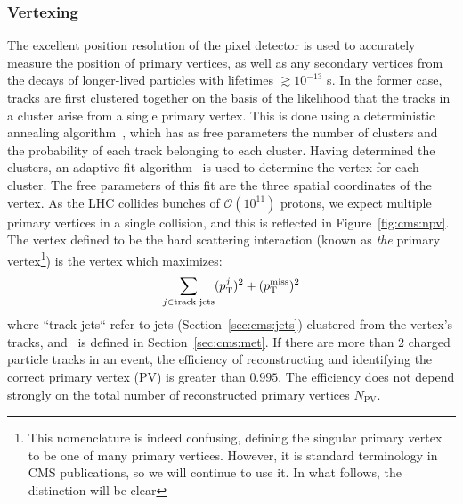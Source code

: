 \subsubsection{Vertexing}

The excellent position resolution of the pixel detector is used to accurately measure the position of primary vertices, as well as any secondary vertices from the decays of longer-lived particles with lifetimes $\gtrsim 10^{-13}$ s.
In the former case, tracks are first clustered together on the basis of the likelihood that the tracks in a cluster arise from a single primary vertex.
This is done using a deterministic annealing algorithm~\cite{da}, which has as free parameters the number of clusters and the probability of each track belonging to each cluster.
Having determined the clusters, an adaptive fit algorithm~\cite{adaptivefit} is used to determine the vertex for each cluster.
The free parameters of this fit are the three spatial coordinates of the vertex.
As the LHC collides bunches of $\mathcal{O}(10^{11})$ protons, we expect multiple primary vertices in a single collision, and this is reflected in Figure~\ref{fig:cms:npv}.
The vertex defined to be the hard scattering interaction (known as \emph{the} primary vertex\footnote{This nomenclature is indeed confusing, defining the singular primary vertex to be one of many primary vertices. However, it is standard terminology in CMS publications, so we will continue to use it. In what follows, the distinction will be clear}) is the vertex which maximizes:
\begin{equation}
    \sum_{j\in\text{track jets}} (p_\mathrm{T}^j)^2 + (p_\mathrm{T}^\mathrm{miss})^2
\end{equation}
where ``track jets`` refer to jets (Section~\ref{sec:cms:jets}) clustered from the vertex's tracks, and \ptmiss~is defined in Section~\ref{sec:cms:met}.
If there are more than 2 charged particle tracks in an event, the efficiency of reconstructing and identifying the correct primary vertex (PV) is greater than $0.995$.
The efficiency does not depend strongly on the total number of reconstructed primary vertices $N_\mathrm{PV}$.

